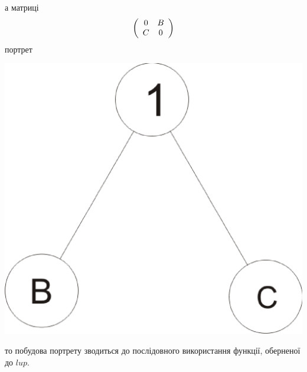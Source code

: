 \documentclass[a4paper,12pt]{article} \usepackage{a4wide}
\numberwithin{equation}{subsection}
\begin{document}
 а матриці
\[
\left( {\begin{array}{*{20}c}
   0 & B  \\
   C & 0  \\
\end{array}} \right)
\]
портрет
\begin{center}
\includegraphics[scale=0.25]{port1ab.eps}
\end{center}
то побудова портрету зводиться до послідовного використання функції, оберненої до $lup$.
\end{document}
